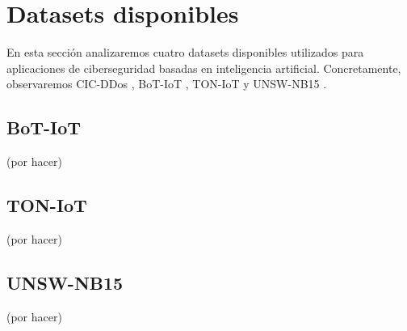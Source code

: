 \section{Datasets disponibles}

En esta sección analizaremos cuatro datasets disponibles utilizados para aplicaciones de ciberseguridad basadas en inteligencia artificial. Concretamente, observaremos CIC-DDos \cite{8888419}, BoT-IoT \cite{DBLP:journals/corr/abs-1811-00701} \cite{10.1007/978-3-319-90775-8_3} \cite{KORONIOTIS202091} \cite{DBLP:journals/corr/abs-2005-00722} \cite{9252856} \cite{phdbotiot}, TON-IoT \cite{MOUSTAFA2021102994} \cite{9444348} \cite{9189760} \cite{9343133} \cite{9343084} \cite{moustafa2019systemic} \cite{ASHRAF2021103041} y UNSW-NB15 \cite{7348942} \cite{doi:10.1080/19393555.2015.1125974} \cite{7948715} \cite{Moustafa2017} \cite{10.1007/978-3-030-72802-1_9}.



\subsection{BoT-IoT}

(por hacer)

\subsection{TON-IoT}

(por hacer)

\subsection{UNSW-NB15}

(por hacer)
